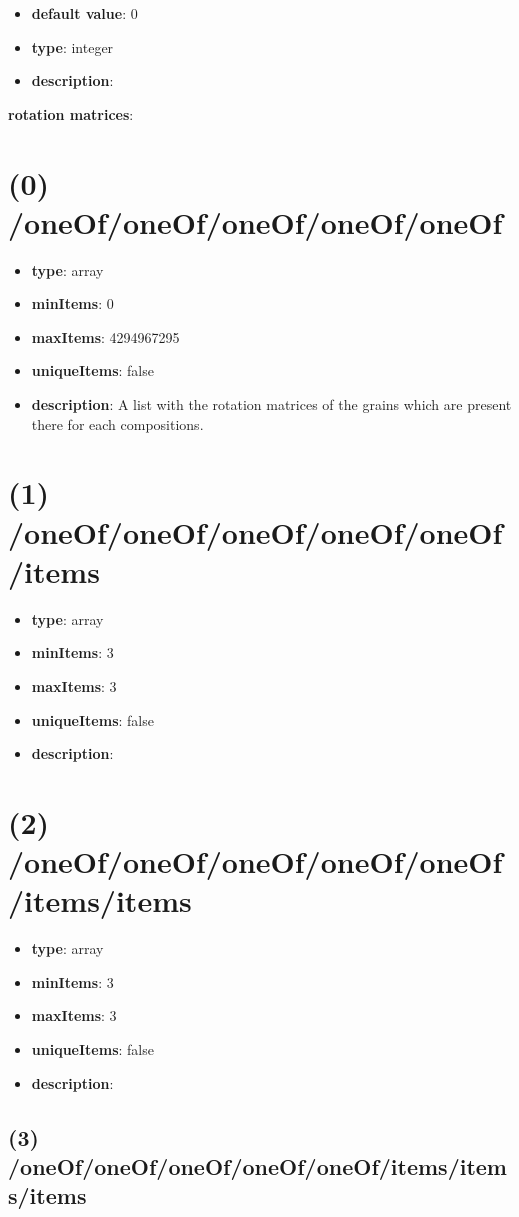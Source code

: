 \begin{itemize}[leftmargin=1em]\item {\bf default value}: 0
\item {\bf type}: integer
\item {\bf description}: 
\end{itemize}\item {\bf rotation matrices}: \section{(0) /oneOf/oneOf/oneOf/oneOf/oneOf}
\begin{itemize}[leftmargin=0em]\item {\bf type}: array
\item {\bf minItems}: 0
\item {\bf maxItems}: 4294967295
\item {\bf uniqueItems}: false
\item {\bf description}: A list with the rotation matrices of the grains which are present there for each compositions.
\end{itemize}\section{(1) /oneOf/oneOf/oneOf/oneOf/oneOf/items}
\begin{itemize}[leftmargin=1em]\item {\bf type}: array
\item {\bf minItems}: 3
\item {\bf maxItems}: 3
\item {\bf uniqueItems}: false
\item {\bf description}: 
\end{itemize}\section{(2) /oneOf/oneOf/oneOf/oneOf/oneOf/items/items}
\begin{itemize}[leftmargin=2em]\item {\bf type}: array
\item {\bf minItems}: 3
\item {\bf maxItems}: 3
\item {\bf uniqueItems}: false
\item {\bf description}: 
\end{itemize}\subsection{(3) /oneOf/oneOf/oneOf/oneOf/oneOf/items/items/items}

